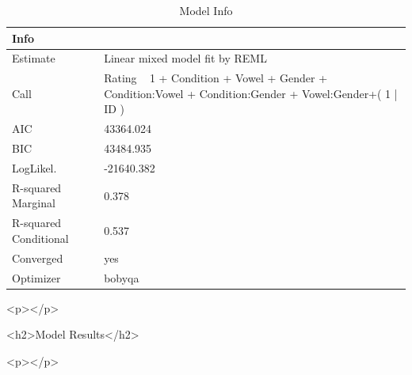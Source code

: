 \documentclass[a4paper,man,hidelinks,floatsintext]{apa7}
\begin{document}
    
\begin{table}[!htbp]
\caption{Model Info}
\label{tab:Table_1}
\begin{adjustbox}{max size={\columnwidth}{\textheight}}
\centering
\begin{tabular}{ll}
\hline
Info                  & ~                                                                                                      \\
\hline
Estimate              & Linear mixed model fit by REML                                                                         \\
Call                  & Rating ~ 1 + Condition + Vowel + Gender + Condition:Vowel + Condition:Gender + Vowel:Gender+( 1 | ID ) \\
AIC                   & 43364.024                                                                                              \\
BIC                   & 43484.935                                                                                              \\
LogLikel.             & -21640.382                                                                                             \\
R-squared Marginal    & 0.378                                                                                                  \\
R-squared Conditional & 0.537                                                                                                  \\
Converged             & yes                                                                                                    \\
Optimizer             & bobyqa                                                                                                 \\
\hline
\end{tabular}
\end{adjustbox}
\begin{tablenotes} {
\small
}
\end{tablenotes}
\end{table}
      
        <p></p>
      
    <h2>Model Results</h2>
      
        <p></p>
      
\end{document}

